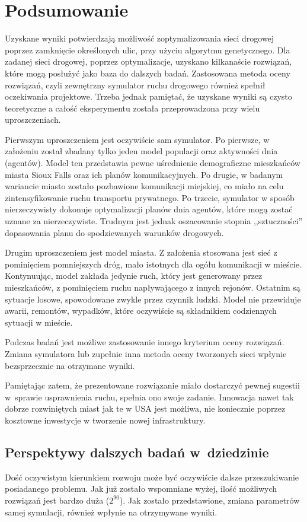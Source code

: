\documentclass[twoside,12pt]{report}
\let\oldsection\chapter
\def\chapter{\cleardoublepage\oldsection}
\begin{document}
\chapter{Podsumowanie}\label{rozdz.podsumowanie} 
Uzyskane wyniki potwierdzają możliwość zoptymalizowania sieci drogowej poprzez zamknięcie określonych ulic, przy użyciu algorytmu genetycznego. Dla zadanej sieci drogowej, poprzez optymalizacje, uzyskano kilkanaście rozwiązań, które mogą posłużyć jako baza do dalszych badań. Zastosowana metoda oceny rozwiązań, czyli zewnętrzny symulator ruchu drogowego również spełnił oczekiwania projektowe. Trzeba jednak pamiętać, że uzyskane wyniki są czysto teoretyczne a całość eksperymentu została przeprowadzona przy wielu uproszczeniach.

Pierwszym uproszczeniem jest oczywiście sam symulator. Po pierwsze, w założeniu został zbadany tylko jeden model populacji oraz aktywności dnia (agentów). Model ten przedstawia pewne uśrednienie demograficzne mieszkańców miasta Sioux Falls oraz ich planów komunikacyjnych. Po drugie, w badanym wariancie miasto zostało pozbawione komunikacji miejskiej, co miało na celu zintensyfikowanie ruchu transportu prywatnego. Po trzecie, symulator w sposób nierzeczywisty dokonuje optymalizacji planów dnia agentów, które mogą zostać uznane za nierzeczywiste. Trudnym jest jednak oszacowanie stopnia ,,sztuczności'' dopasowania planu do spodziewanych warunków drogowych.

Drugim uproszczeniem jest model miasta. Z założenia stosowana jest sieć z pominięciem pomniejszych dróg, mało istotnych dla ogółu komunikacji w mieście. Kontynuując, model zakłada jedynie ruch, który jest generowany przez mieszkańców, z pominięciem ruchu napływającego z innych rejonów. Ostatnim są sytuacje losowe, spowodowane zwykle przez czynnik ludzki. Model nie przewiduje awarii, remontów, wypadków, które oczywiście są składnikiem codziennych sytuacji w mieście. 

Podczas badań jest możliwe zastosowanie innego kryterium oceny rozwiązań. Zmiana symulatora lub zupełnie inna metoda oceny tworzonych sieci wpłynie bezsprzecznie na otrzymane wyniki.

Pamiętając zatem, że prezentowane rozwiązanie miało  dostarczyć pewnej sugestii w~sprawie usprawnienia ruchu, spełnia ono swoje zadanie. Innowacja nawet tak dobrze rozwiniętych miast jak te w USA jest możliwa, nie koniecznie poprzez kosztowne inwestycje w tworzenie nowej infrastruktury. 


\section{Perspektywy dalszych badań w~dziedzinie}
Dość oczywistym kierunkiem rozwoju może być oczywiście dalsze przeszukiwanie posiadanego problemu. Jak już zostało wspomniane wyżej, ilość możliwych rozwiązań jest bardzo duża ($2^{90}$). Jak zostało przedstawione, zmiana parametrów samej symulacji, również wpłynie na otrzymywane wyniki.
\end{document}
